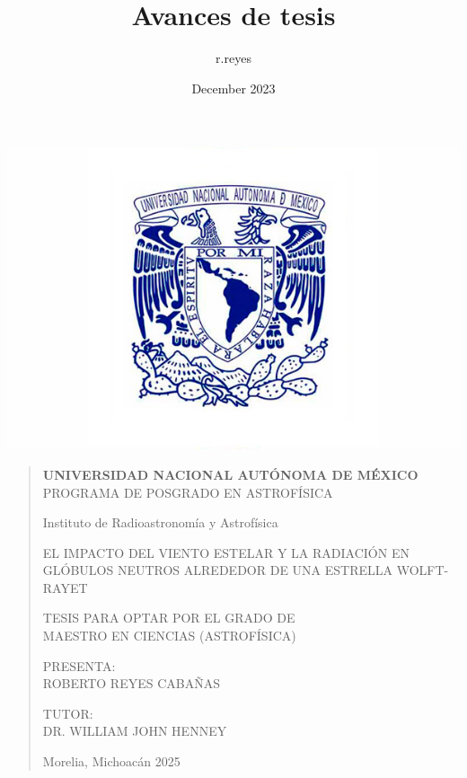 \documentclass{book}
\title{Avances de tesis}
\author{r.reyes }
\date{December 2023}
\begin{document}
\begin{titlepage}
\begin{center}
	\includegraphics[scale=.4]{unam.jpg}
\end{center}	


\begin{quote}	
\begin{center}
\large \textbf{UNIVERSIDAD NACIONAL AUTÓNOMA DE MÉXICO}\\
PROGRAMA DE POSGRADO EN ASTROFÍSICA
\end{center}
\vspace{12pt}
\begin{center}
\Large Instituto de Radioastronomía y Astrofísica
\end{center}
\vspace{16pt}
\begin{center}
\Large EL IMPACTO DEL VIENTO ESTELAR Y LA RADIACIÓN EN GLÓBULOS NEUTROS ALREDEDOR DE UNA ESTRELLA WOLFT-RAYET
\end{center}
\vspace{16pt}
\begin{center}
\large TESIS PARA OPTAR POR EL GRADO DE\\
MAESTRO EN CIENCIAS (ASTROFÍSICA)
\end{center}
\vspace{12pt}
\begin{center}
\small PRESENTA:\\
\large ROBERTO REYES CABAÑAS
\end{center}
\vspace{12pt}
\begin{center}
\small TUTOR:\\
\large DR. WILLIAM JOHN HENNEY 
\end{center}
\vspace{12pt}
\begin{center}
Morelia, Michoacán 2025
\end{center}

\end{quote}
\end{titlepage}
\end{document}
